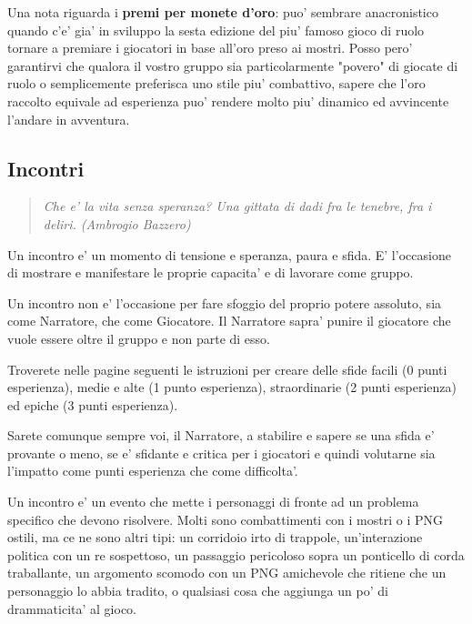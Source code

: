 \documentclass[a4paper,11pt,twoside,openany]{book}
\begin{document}
{\bigskip

Una nota riguarda i \textbf{premi per monete d'oro}: puo' sembrare anacronistico quando c'e' gia' in sviluppo la sesta edizione del piu' famoso gioco di ruolo tornare a premiare i giocatori in base all'oro preso ai mostri. Posso pero' garantirvi che qualora il vostro gruppo sia particolarmente "povero" di giocate di ruolo o semplicemente preferisca uno stile piu' combattivo, sapere che l'oro raccolto equivale ad esperienza puo' rendere molto piu' dinamico ed avvincente l'andare in avventura.

\subsection{Incontri}


\begin{quote}\textit{
{Che e' la vita senza speranza? Una gittata di dadi fra le tenebre, fra i deliri. (Ambrogio Bazzero)}
}\end{quote}

\label{incontri}

Un incontro e' un momento di tensione e speranza, paura e sfida. E' l'occasione di mostrare e manifestare le proprie capacita' e di lavorare come gruppo.

Un incontro non e' l'occasione per fare sfoggio del proprio potere assoluto, sia come Narratore, che come Giocatore. Il Narratore sapra' punire il giocatore che vuole essere oltre il gruppo e non parte di esso.

Troverete nelle pagine seguenti le istruzioni per creare delle sfide facili (0 punti esperienza), medie e alte (1 punto esperienza), straordinarie (2 punti esperienza) ed epiche (3 punti esperienza).

Sarete comunque sempre voi, il Narratore, a stabilire e sapere se una sfida e' provante o meno, se e' sfidante e critica per i giocatori e quindi volutarne sia l'impatto come punti esperienza che come difficolta'.

Un incontro e' un evento che mette i personaggi di fronte ad un problema specifico che devono risolvere. Molti sono combattimenti con i mostri o i PNG ostili, ma ce ne sono altri tipi: un corridoio irto di trappole, un'interazione politica con un re sospettoso, un passaggio pericoloso sopra un ponticello di corda traballante, un argomento scomodo con un PNG amichevole che ritiene che un personaggio lo abbia tradito, o qualsiasi cosa che aggiunga un po' di drammaticita' al gioco.

}
\end{document}
